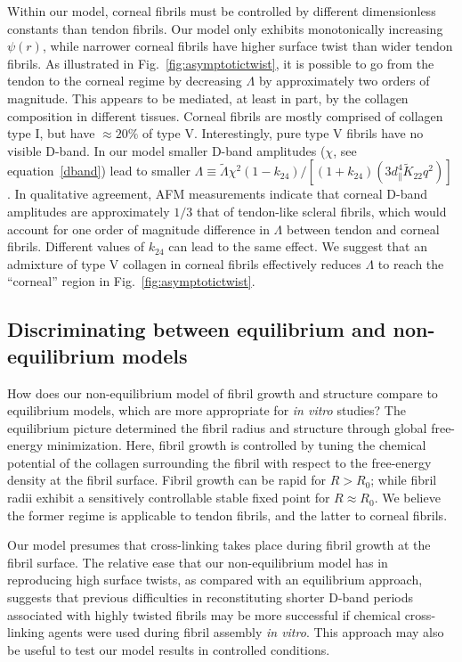 \documentclass[twoside,twocolumn,9pt]{article}
\begin{document}
Within our model, corneal fibrils must be controlled by different dimensionless constants than tendon fibrils. Our model only exhibits monotonically increasing $\psi(r)$, while narrower corneal fibrils have higher surface twist than wider tendon fibrils. As illustrated in Fig.~\ref{fig:asymptotictwist}, it is possible to go from the tendon to the corneal regime by decreasing $\Lambda$ by approximately two orders of magnitude. This appears to be mediated, at least in part, by the collagen composition in different tissues. Corneal fibrils are mostly comprised of collagen type I, but have $\approx 20\%$ of type V. Interestingly, pure type V fibrils have no visible D-band.\cite{Birk:1990} In our model smaller D-band amplitudes ($\chi$, see equation~\ref{dband}) lead to smaller $\Lambda \equiv \tilde{\Lambda}\chi^2 (1-k_{24})/ \left[(1+k_{24})(3d_\parallel^4\tilde{K}_{22}q^2)\right]$. In qualitative agreement, AFM measurements indicate that corneal D-band amplitudes are approximately $1/3$ that of tendon-like scleral fibrils,\cite{Yamamoto:1997} which would account for one order of magnitude difference in $\Lambda$ between tendon and corneal fibrils. Different values of $k_{24}$ can lead to the same effect. We suggest that an admixture of type V collagen in corneal fibrils effectively reduces $\Lambda$ to reach the ``corneal'' region in Fig.~\ref{fig:asymptotictwist}.\cite{medium}

\subsection{Discriminating between equilibrium and non-equilibrium models}
How does our non-equilibrium model of fibril growth and structure compare to equilibrium models,\cite{Cameron:2020} which are more appropriate for \emph{in vitro} studies? The equilibrium picture determined the fibril radius and structure through global free-energy minimization. Here, fibril growth is controlled by tuning the chemical potential of the collagen surrounding the fibril with respect to the free-energy density at the fibril surface. Fibril growth can be rapid for $R > R_0$; while fibril radii exhibit a sensitively controllable stable fixed point for $R \approx R_0$. We believe the former regime is applicable to tendon fibrils, and the latter to corneal fibrils. 

Our model presumes that cross-linking takes place during fibril growth at the fibril surface. The relative ease that our non-equilibrium model has in reproducing high surface twists, as compared with an equilibrium approach,\cite{Cameron:2020} suggests that previous difficulties in reconstituting shorter D-band periods associated with highly twisted fibrils\cite{Raspanti:2018, Brodsky:1980} may be more successful if chemical cross-linking agents\cite{JorgeHerrero:1999} were used during fibril assembly \emph{in vitro}. This approach may also be useful to test our model results in controlled conditions.
\end{document}
